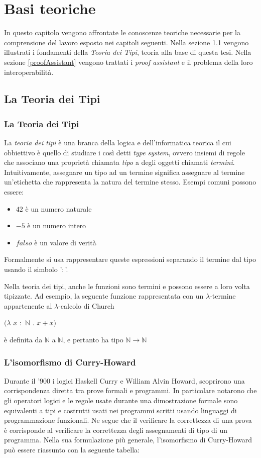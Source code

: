 \documentclass[12pt,a4paper]{report}
\begin{document}
\chapter{Basi teoriche}
In questo capitolo vengono affrontate le conoscenze teoriche necessarie per la
comprensione del lavoro esposto nei capitoli seguenti. Nella sezione \ref{teoriaDeiTipi}
vengono illustrati i fondamenti della \textit{Teoria dei Tipi}, teoria alla base 
di questa tesi. Nella sezione \ref{proofAssistant} vengono trattati i \textit{proof 
assistant} e il problema della loro interoperabilità.

\section{La Teoria dei Tipi} \label{teoriaDeiTipi}
\subsection{La Teoria dei Tipi}
La \textit{teoria dei tipi} è una branca della logica e dell'informatica teorica il
cui obbiettivo è quello di studiare i così detti \textit{type system}, ovvero
insiemi di regole che associano una proprietà chiamata \textit{tipo} a degli oggetti
chiamati \textit{termini}. Intuitivamente, assegnare un tipo ad un termine significa
assegnare al termine un'etichetta che rappresenta la natura del termine stesso.
Esempi comuni possono essere: 
\begin{itemize}
  \item $42$ è un numero naturale 
  \item $-5$ è un numero intero
  \item $falso$ è un valore di verità 
\end{itemize}

Formalmente si usa rappresentare queste espressioni separando il termine dal tipo usando
il simbolo '$:$'. 

Nella teoria dei tipi, anche le funzioni sono termini e possono essere
a loro volta tipizzate. Ad esempio, la seguente funzione rappresentata con un $\lambda$-termine
appartenente al $\lambda$-calcolo di Church 
\begin{center}
  $(\lambda$ $x$ $:$ $\mathbb{N}$ $.$ $x + x)$
\end{center}

è definita da $\mathbb{N}$ a $\mathbb{N}$, e pertanto ha tipo $\mathbb{N} \rightarrow \mathbb{N}$

\subsection{L'isomorfismo di Curry-Howard}
Durante il '900 i logici Haskell Curry e William Alvin Howard, scoprirono una
corrispondenza diretta tra prove formali e programmi. In particolare notarono
che gli operatori logici e le regole usate durante una dimostrazione formale
sono equivalenti a tipi e costrutti usati nei programmi scritti usando linguaggi
di programmazione funzionali. Ne segue che il verificare la correttezza di una
prova è corrisponde al verificare la correttezza degli assegnamenti di tipo di un
programma. Nella sua formulazione più generale, l'isomorfismo di Curry-Howard
può essere riassunto con la seguente tabella:
\end{document}

